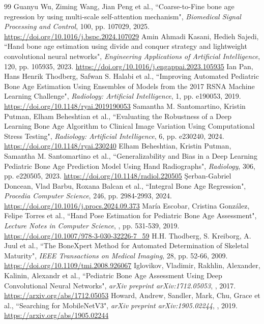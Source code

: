 \begin{thebibliography}{99}
 Guanyu Wu, Ziming Wang, Jian Peng et al., ``Coarse-to-Fine bone age regression by using multi-scale self-attention mechanism", \emph{Biomedical Signal Processing and Control}, 100, pp. 107029, 2025. \url{https://doi.org/10.1016/j.bspc.2024.107029}
 Amin Ahmadi Kasani, Hedieh Sajedi, ``Hand bone age estimation using divide and conquer strategy and lightweight convolutional neural networks", \emph{Engineering Applications of Artificial Intelligence}, 120, pp. 105935, 2023. \url{https://doi.org/10.1016/j.engappai.2023.105935}
 Ian Pan, Hans Henrik Thodberg, Safwan S. Halabi et al., ``Improving Automated Pediatric Bone Age Estimation Using Ensembles of                     Models from the 2017 RSNA Machine Learning Challenge", \emph{Radiology: Artificial Intelligence}, 1, pp. e190053, 2019. \url{https://doi.org/10.1148/ryai.2019190053}
 Samantha M. Santomartino, Kristin Putman, Elham Beheshtian et al., ``Evaluating the Robustness of a Deep Learning Bone Age Algorithm to Clinical Image Variation Using Computational Stress Testing", \emph{Radiology: Artificial Intelligence}, 6, pp. e230240, 2024. \url{https://doi.org/10.1148/ryai.230240}
 Elham Beheshtian, Kristin Putman, Samantha M. Santomartino et al., ``Generalizability and Bias in a Deep Learning Pediatric Bone Age                     Prediction Model Using Hand Radiographs", \emph{Radiology}, 306, pp. e220505, 2023. \url{https://doi.org/10.1148/radiol.220505}
 Şerban-Gabriel Doncean, Vlad Barbu, Roxana Balcan et al., ``Integral Bone Age Regression", \emph{Procedia Computer Science}, 246, pp. 2984-2993, 2024. \url{https://doi.org/10.1016/j.procs.2024.09.373}
 María Escobar, Cristina González, Felipe Torres et al., ``Hand Pose Estimation for Pediatric Bone Age Assessment", \emph{Lecture Notes in Computer Science}, , pp. 531-539, 2019. \url{https://doi.org/10.1007/978-3-030-32226-7_59}
 H.H. Thodberg, S. Kreiborg, A. Juul et al., ``The BoneXpert Method for Automated Determination of Skeletal Maturity", \emph{IEEE Transactions on Medical Imaging}, 28, pp. 52-66, 2009. \url{https://doi.org/10.1109/tmi.2008.926067}
 Iglovikov, Vladimir, Rakhlin, Alexander, Kalinin, Alexandr et al., ``Pediatric Bone Age Assessment Using Deep Convolutional Neural Networks", \emph{arXiv preprint arXiv:1712.05053}, , 2017. \url{https://arxiv.org/abs/1712.05053}
 Howard, Andrew, Sandler, Mark, Chu, Grace et al., ``Searching for MobileNetV3", \emph{arXiv preprint arXiv:1905.02244}, , 2019. \url{https://arxiv.org/abs/1905.02244}

\end{thebibliography}
